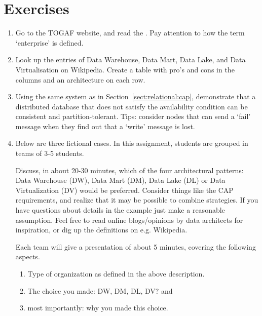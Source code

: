 \section{Exercises}
\begin{enumerate}
\item Go to the TOGAF website, and read the
. Pay attention to how the term `enterprise' is defined.

\item Look up the entries of Data Warehouse, Data Mart, Data Lake,
and Data Virtualisation on Wikipedia. Create a table with pro's and cons
in the columns and an architecture on each row.
\item Using the same system as in Section~\ref{sect:relational:cap},
demonstrate that a distributed database that does not satisfy the availability
condition can be consistent and partition-tolerant. Tips: consider nodes that
can send a `fail' message when they find out that a `write' message is lost.

\item Below are three fictional cases. In this assignment, students are grouped
in teams of 3-5 students. 


Discuss, in about 20-30 minutes, which of the four architectural patterns: Data
Warehouse (DW), Data Mart (DM), Data Lake (DL) or Data Virtualization (DV)
would be preferred. Consider things like the CAP requirements, and realize that
it may be possible to combine strategies. If you have questions about details
in the example just make a reasonable assumption. Feel free to read online
blogs/opinions by data architects for inspiration, or dig up the definitions on
e.g. Wikipedia.


Each team will give a presentation of about 5 minutes, covering the following aspects.
\begin{enumerate}
\item Type of organization as defined in the above description.
\item The choice you made: DW, DM, DL, DV? and
\item most importantly: why you made this choice.
\end{enumerate}
\end{enumerate}


